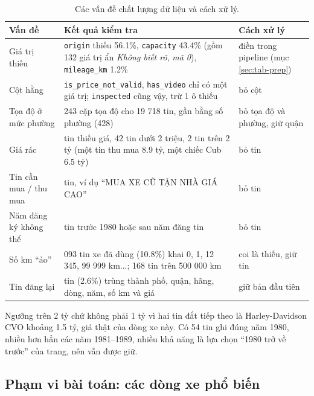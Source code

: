\begin{table}[H]\centering
\caption{Các vấn đề chất lượng dữ liệu và cách xử lý.}\label{tab:tab-quality}
\begin{tabular}{>{\raggedright\arraybackslash}p{4.4cm}>{\raggedright\arraybackslash}p{5.2cm}>{\raggedright\arraybackslash}p{4.6cm}}
\toprule
Vấn đề & Kết quả kiểm tra & Cách xử lý \\
\midrule
Giá trị thiếu & \texttt{origin} thiếu 56.1\%, \texttt{capacity} 43.4\% (gồm 132 giá trị ẩn \textit{Không biết rõ}, \textit{mã 0}), \texttt{mileage\_km} 1.2\% & điền trong pipeline (mục \ref{sec:tab-prep}) \\
Cột hằng & \texttt{is\_price\_not\_valid}, \texttt{has\_video} chỉ có một giá trị; \texttt{inspected} cũng vậy, trừ 1 ô thiếu & bỏ cột \\
Tọa độ ở mức phường & 1 243 cặp tọa độ cho 19 718 tin, gần bằng số phường (428) & bỏ tọa độ và phường, giữ quận \\
Giá rác & 1 tin thiếu giá, 42 tin dưới 2 triệu, 2 tin trên 2 tỷ (một tin thu mua 8.9 tỷ, một chiếc Cub 6.5 tỷ) & bỏ tin \\
Tin cần mua / thu mua & 32 tin, ví dụ ``MUA XE CŨ TẬN NHÀ GIÁ CAO'' & bỏ tin \\
Năm đăng ký không thể & 3 tin trước 1980 hoặc sau năm đăng tin & bỏ tin \\
Số km ``ảo'' & 2 093 tin xe đã dùng (10.8\%) khai 0, 1, 12 345, 99 999 km...; 168 tin trên 500 000 km & coi là thiếu, giữ tin \\
Tin đăng lại & 518 tin (2.6\%) trùng thành phố, quận, hãng, dòng, năm, số km và giá & giữ bản đầu tiên \\
\bottomrule
\end{tabular}
\end{table}


Ngưỡng trên 2 tỷ chứ không phải 1 tỷ vì hai tin đắt tiếp theo là Harley-Davidson CVO khoảng 1.5 tỷ, giá thật của dòng
xe này. Có 54 tin ghi đúng năm 1980, nhiều hơn hẳn các năm 1981--1989, nhiều khả năng là lựa chọn ``1980 trở về trước''
của trang, nên vẫn được giữ.

\subsection{Phạm vi bài toán: các dòng xe phổ biến}

